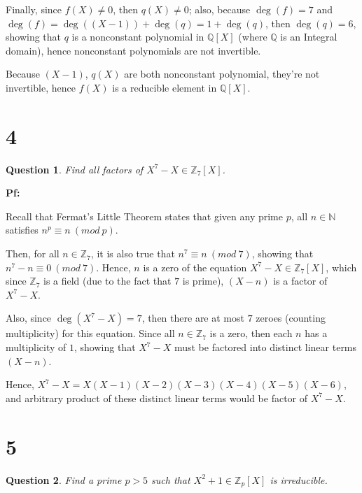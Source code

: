 \documentclass{article}
\newtheorem{question}{Question}
\begin{document}
\hfill

Finally, since $f(X)\neq 0$, then $q(X)\neq 0$; also, because $\deg(f)=7$ and $\deg(f)=\deg((X-1))+\deg(q) = 1+\deg(q)$, then $\deg(q)=6$, showing that $q$ is a nonconstant polynomial in $\mathbb{Q}[X]$ 
(where $\mathbb{Q}$ is an Integral domain), hence nonconstant polynomials are not invertible.

Because $(X-1)$, $q(X)$ are both nonconstant polynomial, they're not invertible, hence $f(X)$ is a reducible element in $\mathbb{Q}[X]$.


\break

\section*{4}
\begin{myBox}[]{}
    \begin{question}
        Find all factors of $X^7-X\in \mathbb{Z}_7[X]$.
    \end{question}
\end{myBox}

\textbf{Pf:}

Recall that Fermat's Little Theorem states that given any prime $p$, all $n\in\mathbb{N}$ satisfies $n^p\equiv n\ (mod\ p)$.

Then, for all $n\in\mathbb{Z}_7$, it is also true that $n^7\equiv n\ (mod\ 7)$, showing that $n^7-n\equiv 0\ (mod\ 7)$.
Hence, $n$ is a zero of the equation $X^7-X \in \mathbb{Z}_7[X]$, which since $\mathbb{Z}_7$ is a field (due to the fact that $7$ is prime),
$(X-n)$ is a factor of $X^7-X$.

Also, since $\deg(X^7-X)=7$, then there are at most $7$ zeroes (counting multiplicity) for this equation. Since all $n\in\mathbb{Z}_7$ is a zero, 
then each $n$ has a multiplicity of $1$, showing that $X^7-X$ must be factored into distinct linear terms $(X-n)$.

Hence, $X^7-X = X(X-1)(X-2)(X-3)(X-4)(X-5)(X-6)$, and arbitrary product of these distinct linear terms would be factor of $X^7-X$.

\hfill

\hfill

\section*{5}
\begin{myBox}[]{}
    \begin{question}
        Find a prime $p > 5$ such that $X^2+1\in \mathbb{Z}_p[X]$ is irreducible.
    \end{question}
\end{myBox}
\end{document}
